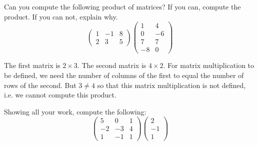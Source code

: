 \documentclass[11pt,letterpaper]{article}
\begin{document}
\newpage





 Can you compute the following product of matrices? If you can, compute the product. If you can not, explain why. 
	\[
	\begin{pmatrix}
	1 & -1 & 8 \\
	2 & 3 & 5 
	\end{pmatrix}
	\begin{pmatrix}
	1 & 4 \\
	0 & -6 \\
	7 & 7 \\
	-8 & 0
	\end{pmatrix}
	\] \pspace

\sol The first matrix is $2 \times 3$. The second matrix is $4 \times 2$. For matrix multiplication to be defined, we need the number of columns of the first to equal the number of rows of the second. But $3 \neq 4$ so that this matrix multiplication is not defined, i.e. we cannot compute this product. 





\newpage





 Showing all your work, compute the following:
	\[
	\begin{pmatrix}
	5 & 0 & 1 \\
	-2 & -3 & 4 \\
	1 & -1 & 1
	\end{pmatrix}
	\begin{pmatrix}
	2 \\
	-1 \\
	1
	\end{pmatrix}
	\] \pspace
\end{document}

